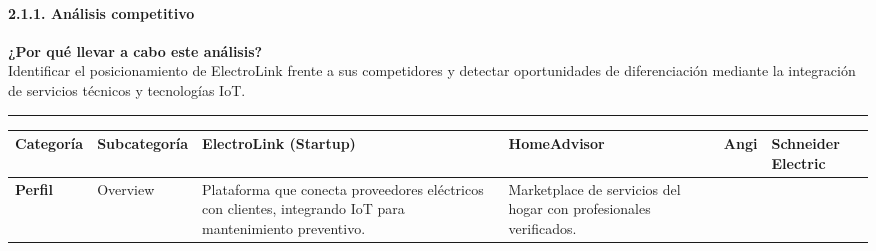 \paragraph{2.1.1. Análisis
competitivo}\label{report__20-cap2-requirements-analysis.md__anuxe1lisis-competitivo}

\textbf{¿Por qué llevar a cabo este análisis?}\\
Identificar el posicionamiento de ElectroLink frente a sus competidores
y detectar oportunidades de diferenciación mediante la integración de
servicios técnicos y tecnologías IoT.

\begin{center}\rule{0.5\linewidth}{0.5pt}\end{center}

{\def\LTcaptype{none} %
\begin{longtable}[]{@{}
  >{\raggedright\arraybackslash}p{}
  >{\raggedright\arraybackslash}p{}
  >{\raggedright\arraybackslash}p{}
  >{\raggedright\arraybackslash}p{}
  >{\raggedright\arraybackslash}p{}
  >{\raggedright\arraybackslash}p{}@{}}
\toprule\noalign{}
\begin{minipage}[b]{\linewidth}\raggedright
Categoría
\end{minipage} & \begin{minipage}[b]{\linewidth}\raggedright
Subcategoría
\end{minipage} & \begin{minipage}[b]{\linewidth}\raggedright
ElectroLink (Startup)
\end{minipage} & \begin{minipage}[b]{\linewidth}\raggedright
HomeAdvisor
\end{minipage} & \begin{minipage}[b]{\linewidth}\raggedright
Angi
\end{minipage} & \begin{minipage}[b]{\linewidth}\raggedright
Schneider Electric
\end{minipage} \\
\midrule\noalign{}
\endhead
\bottomrule\noalign{}
\endlastfoot
\textbf{Perfil} & Overview & Plataforma que conecta proveedores
eléctricos con clientes, integrando IoT para mantenimiento preventivo. &
Marketplace de servicios del hogar con profesionales verificados. &

\end{longtable}}
